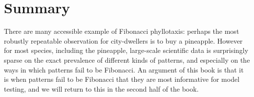  \section{Summary}
 There are many accessible example of Fibonacci phyllotaxis: perhaps the most robustly repeatable observation for city-dwellers is to buy a pineapple. However for most species, including the pineapple,  large-scale scientific data is surprisingly sparse on the exact prevalence of different kinds of patterns, and especially on the ways in which patterns fail to be Fibonacci. An argument of this book is that it is when patterns fail to be Fibonacci that they are most informative for model testing, and we will return to this in the second half of the book. 
